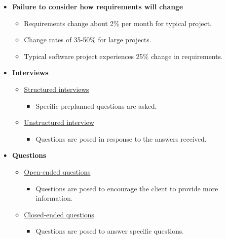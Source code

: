 \documentclass[10pt]{article}
\begin{document}
\begin{multicols}{5}
\begin{block}
\begin{itemize}
  \item \textbf{Failure to consider how requirements will change}
  \begin{itemize}
    \item Requirements change about 2\% per month for typical project.
    \item Change rates of 35-50\% for large projects.
    \item Typical software project experiences 25\% change in requirements.
  \end{itemize}
\end{itemize}
\end{block}


\begin{block}
\begin{itemize}
  \item \textbf{Interviews}
  \begin{itemize}
    \item \underline{Structured interviews}
    \begin{itemize}
      \item Specific preplanned questions are asked.
    \end{itemize}
    \item \underline{Unstructured interview}
    \begin{itemize}
      \item Questions are posed in response to the answers received.
    \end{itemize}
  \end{itemize}
  \item \textbf{Questions}
  \begin{itemize}
    \item \underline{Open-ended questions}
    \begin{itemize}
      \item Questions are posed to encourage the client to provide more information.
    \end{itemize}
    \item \underline{Closed-ended questions}
    \begin{itemize}
      \item Questions are posed to answer specific questions.
    \end{itemize}
  \end{itemize}
\end{itemize}
\end{block}


\end{multicols}
\end{document}
